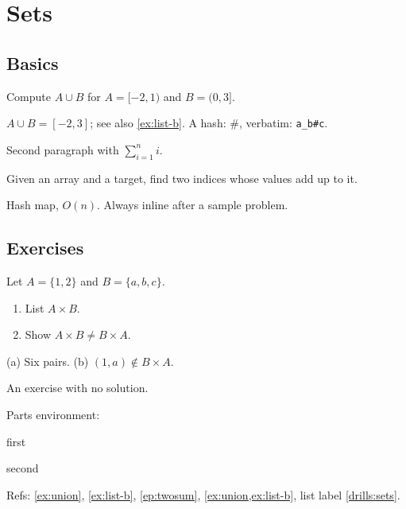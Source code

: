 \documentclass[solutions=chapter]{akizumi-book}
\begin{document}
\tableofcontents
\chapter{Sets}
\section{Basics}
\begin{exercise}[Union]\label{ex:union}
Compute $A\cup B$ for $A=[-2,1)$ and $B=(0,3]$.
\end{exercise}
\begin{solution}
$A\cup B=[-2,3]$; see also \cref{ex:list-b}. A hash: \#, verbatim: \verb|a_b#c|.

Second paragraph with $\sum_{i=1}^n i$.
\end{solution}

\begin{example-problem}[title=Two Sum, source=LeetCode 1]\label{ep:twosum}
Given an array and a target, find two indices whose values add up to it.
\end{example-problem}
\begin{solution}
Hash map, $O(n)$. Always inline after a sample problem.
\end{solution}

\section{Exercises}
\begin{exercises}[title]
\label{drills:sets}
\item Let $A=\{1,2\}$ and $B=\{a,b,c\}$.
  \begin{enumerate}
  \item List $A\times B$.
  \item Show $A\times B\neq B\times A$.
  \end{enumerate}
  \begin{solution}
  (a) Six pairs. (b) $(1,a)\notin B\times A$.
  \end{solution}
\item\label{ex:list-b} An exercise with no solution.
\item Parts environment:
  \begin{parts}
  \item first \item second
  \end{parts}
\end{exercises}
Refs: \cref{ex:union}, \cref{ex:list-b}, \cref{ep:twosum}, \cref{ex:union,ex:list-b},
list label \ref{drills:sets}.
\end{document}
